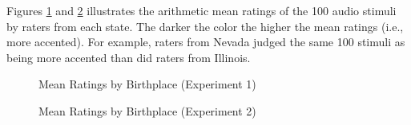 \label{ap:C}

Figures \ref{fig:bp1} and \ref{fig:bp2} illustrates the arithmetic mean ratings of the 100 audio stimuli by raters from each state. The darker the color the higher the mean ratings (i.e., more accented). For example, raters from Nevada judged the same 100 stimuli as being more accented than did raters from Illinois.

  \figSpace
\begin{figure}[h]
    \centering
    
    \caption{Mean Ratings by Birthplace (Experiment 1)}
    \label{fig:bp1}
  \figSpace
\end{figure}

  \figSpace
\begin{figure}[h]
    \centering
    
    \caption{Mean Ratings by Birthplace (Experiment 2)}
    \label{fig:bp2}
  \figSpace
\end{figure}